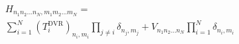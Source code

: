 \begin{multline}
    H_{n_1 n_2 ... n_N, m_1 m_2 ... m_N} = \\ 
        \sum_{i = 1}^{N} (T^{\mathrm{DVR}}_i)_{n_i, m_i}  \prod_{j \ne	 i} \delta_{n_j, m_j} + 
        V_{n_1 n_2 ... n_N}  \prod_{i = 1}^{N}  \delta_{n_i, m_i}
\label{eq:dvr_multi_Ham}
\end{multline}
